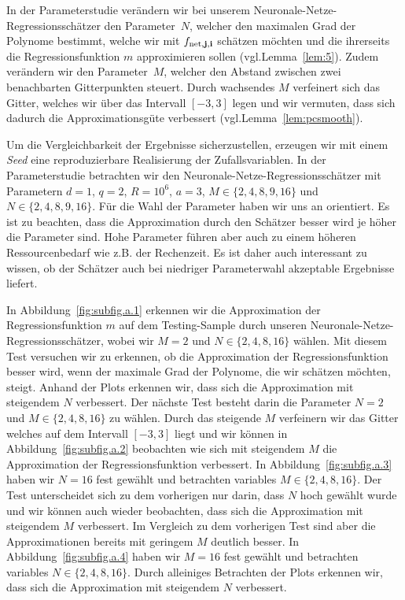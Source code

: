 In der Parameterstudie verändern wir bei unserem Neuronale-Netze-Regressionsschätzer den Parameter~$N$, welcher den maximalen Grad der Polynome bestimmt, welche wir mit $f_{\mathrm{net},\mathbf{j},\mathbf{i}}$ schätzen möchten und die ihrerseits die Regressionsfunktion $m$  approximieren sollen (vgl.\@ Lemma~\ref{lem:5}). Zudem verändern wir den Parameter~$M$, welcher den Abstand zwischen zwei benachbarten Gitterpunkten steuert. Durch wachsendes $M$ verfeinert sich das Gitter, welches wir über das Intervall $[-3,3]$ legen und wir vermuten, dass sich dadurch die Approximationsgüte verbessert (vgl.\@ Lemma~\ref{lem:pcsmooth}). 

Um die Vergleichbarkeit der Ergebnisse sicherzustellen, erzeugen wir mit einem \emph{Seed} eine reproduzierbare Realisierung der Zufallsvariablen. In der Parameterstudie betrachten wir den Neuronale-Netze-Regressionsschätzer mit Parametern $d = 1$, $q = 2$, $R = 10^6$, $a = 3$, $M \in\{2,4,8,9,16\}$ und $N \in \{2,4,8,9,16\}$. Für die Wahl der Parameter haben wir uns an \cite{kohler19} orientiert. Es ist zu beachten, dass die Approximation durch den Schätzer besser wird je höher die Parameter sind. Hohe Parameter führen aber auch zu einem höheren Ressourcenbedarf wie z.B. der Rechenzeit. Es ist daher auch interessant zu wissen, ob der Schätzer auch bei niedriger Parameterwahl akzeptable Ergebnisse liefert.

In Abbildung~\ref{fig:subfig.a.1} erkennen wir die Approximation der Regressionsfunktion $m$ auf dem Testing-Sample durch unseren Neuronale-Netze-Regressionsschätzer, wobei wir $M = 2$ und $N \in \{2,4,8,16\}$ wählen. Mit diesem Test versuchen wir zu erkennen, ob die Approximation der Regressionsfunktion besser wird, wenn der maximale Grad der Polynome, die wir schätzen möchten, steigt. Anhand der Plots erkennen wir, dass sich die Approximation mit steigendem $N$ verbessert.
Der nächste Test besteht darin die Parameter $N = 2$ und $M \in \{2,4,8,16\} $ zu wählen. Durch das steigende $M$ verfeinern wir das Gitter welches auf dem Intervall $[-3,3]$ liegt und wir können in Abbildung~\ref{fig:subfig.a.2}  beobachten wie sich mit steigendem $M$ die Approximation der Regressionsfunktion verbessert. In Abbildung~\ref{fig:subfig.a.3} haben wir $N = 16$ fest gewählt und betrachten variables $M \in \{2,4,8,16\}$. Der Test unterscheidet sich zu dem vorherigen nur darin, dass $N$ hoch gewählt wurde und wir können auch wieder beobachten, dass sich die Approximation mit steigendem $M$ verbessert. Im Vergleich zu dem vorherigen Test sind aber die Approximationen bereits mit geringem $M$ deutlich besser.
In Abbildung~\ref{fig:subfig.a.4} haben wir $M = 16$ fest gewählt und betrachten variables $N \in \{2,4,8,16\}$. Durch alleiniges Betrachten der Plots erkennen wir, dass sich die Approximation mit steigendem $N$ verbessert.

